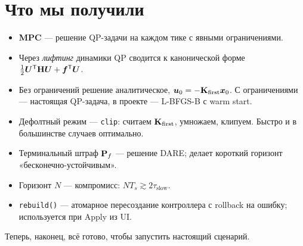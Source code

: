 \section{Что мы получили}

\begin{itemize}
  \item \textbf{MPC} --- решение QP-задачи на каждом тике с явными
        ограничениями.
  \item Через \emph{лифтинг} динамики QP сводится к канонической форме
        $\tfrac{1}{2}\bm{U}^{\mathsf{T}} \mathbf{H}\bm{U} + \bm{f}^{\mathsf{T}} \bm{U}$.
  \item Без ограничений решение аналитическое, $\bm{u}_0 =
        -\mathbf{K}_\text{first}\bm{x}_0$. С ограничениями --- настоящая
        QP-задача, в проекте --- L-BFGS-B с warm start.
  \item Дефолтный режим --- \texttt{clip}: считаем $\mathbf{K}_\text{first}$,
        умножаем, клипуем. Быстро и в большинстве случаев оптимально.
  \item Терминальный штраф $\mathbf{P}_f$ --- решение DARE; делает короткий
        горизонт «бесконечно-устойчивым».
  \item Горизонт $N$ --- компромисс: $N T_s \gtrsim 2 \tau_\text{slow}$.
  \item \texttt{rebuild()} --- атомарное пересоздание контроллера с
        rollback на ошибку; используется при Apply из UI.
\end{itemize}

Теперь, наконец, всё готово, чтобы запустить настоящий сценарий.
